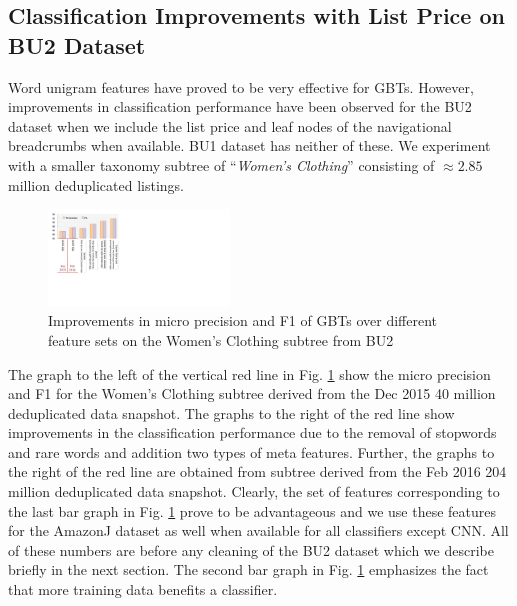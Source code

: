 \subsection{Classification Improvements with List Price on BU2 Dataset}
\label{Subsect:BU2-classification-improve-list-price}


Word unigram features have proved to be very effective for GBTs. 
However, improvements in classification performance have been observed for the BU2 dataset when we include the list price and leaf nodes of the navigational breadcrumbs when available. 
BU1 dataset has neither of these.
We experiment with a smaller taxonomy subtree of ``\textit{Women's Clothing}'' consisting of $\approx2.85$ million deduplicated listings. 

\begin{figure}
	\vspace{-0.5cm}
	\centering
	\includegraphics[width=0.43\textwidth]{images/BU2-gbt-feature-improvements}
	\caption{Improvements in micro precision and F1 of GBTs over different feature sets on the Women's Clothing subtree from BU2}
	\label{Figure_BU2-gbt-feature-improvements}
	\vspace{-0.4cm}
\end{figure}
The graph to the left of the vertical red line in Fig. \ref{Figure_BU2-gbt-feature-improvements} show the micro precision and F1 for the Women's Clothing subtree derived from the Dec 2015 40 million deduplicated data snapshot.
The graphs to the right of the red line show improvements in the classification performance due to the removal of stopwords and rare words and addition two types of meta features.
Further, the graphs to the right of the red line are obtained from subtree derived from the Feb 2016 204 million deduplicated data snapshot.
Clearly, the set of features corresponding to the last bar graph in Fig. \ref{Figure_BU2-gbt-feature-improvements} prove to be advantageous and we use these features for the AmazonJ dataset as well when available for all classifiers except CNN.
All of these numbers are before any cleaning of the BU2 dataset which we describe briefly in the next section.
The second bar graph in Fig. \ref{Figure_BU2-gbt-feature-improvements} emphasizes the fact that more training data benefits a classifier.

